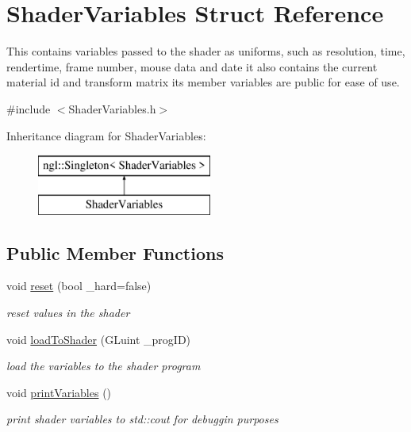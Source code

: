 \hypertarget{struct_shader_variables}{\section{Shader\-Variables Struct Reference}
\label{struct_shader_variables}
}


This contains variables passed to the shader as uniforms, such as resolution, time, rendertime, frame number, mouse data and date it also contains the current material id and transform matrix its member variables are public for ease of use.  




{\ttfamily \#include $<$Shader\-Variables.\-h$>$}

Inheritance diagram for Shader\-Variables\-:\begin{figure}[H]
\begin{center}
\leavevmode
\includegraphics[height=2.000000cm]{struct_shader_variables}
\end{center}
\end{figure}
\subsection*{Public Member Functions}
\begin{DoxyCompactItemize}
\item 
void \hyperlink{struct_shader_variables_a6c4056a98de2375814f543ac22b5f7a4}{reset} (bool \-\_\-hard=false)
\begin{DoxyCompactList}\small\item\em reset values in the shader \end{DoxyCompactList}\item 
void \hyperlink{struct_shader_variables_a47ff8143a673b365033858fa1acc3d10}{load\-To\-Shader} (G\-Luint \-\_\-prog\-I\-D)
\begin{DoxyCompactList}\small\item\em load the variables to the shader program \end{DoxyCompactList}\item 
\hypertarget{struct_shader_variables_a022653bc55d573feb772b1502949ad8e}{void \hyperlink{struct_shader_variables_a022653bc55d573feb772b1502949ad8e}{print\-Variables} ()}\label{struct_shader_variables_a022653bc55d573feb772b1502949ad8e}

\begin{DoxyCompactList}\small\item\em print shader variables to std\-::cout for debuggin purposes \end{DoxyCompactList}\end{DoxyCompactItemize}
